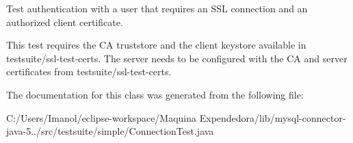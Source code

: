Test authentication with a user that requires an S\+SL connection and an authorized client certificate.

This test requires the CA truststore and the client keystore available in testsuite/ssl-\/test-\/certs. The server needs to be configured with the CA and server certificates from testsuite/ssl-\/test-\/certs. 

The documentation for this class was generated from the following file\+:\begin{DoxyCompactItemize}
\item 
C\+:/\+Users/\+Imanol/eclipse-\/workspace/\+Maquina Expendedora/lib/mysql-\/connector-\/java-\/5../src/testsuite/simple/Connection\+Test.\+java\end{DoxyCompactItemize}
